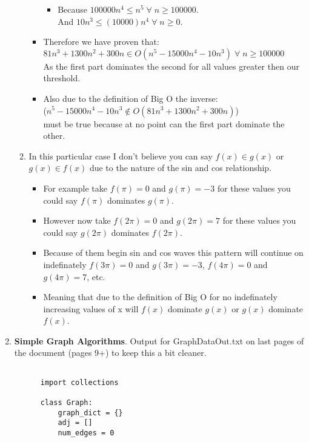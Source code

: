 \documentclass{article}
\begin{document}
\begin{enumerate}
\begin{enumerate}
\begin{itemize}
\begin{itemize}
            \item Because $100000n^4 \leq n^5 \;\forall\; n \geq 100000$. \\
                  And $10n^3 \leq (10000)n^4 \;\forall\; n \geq 0$.
          \end{itemize}
          \item Therefore we have proven that: \\
          $81n^3 + 1300n^2 + 300n \in O(n^5 - 15000n^4 - 10n^3)\;\forall\;n \geq 100000$ \\
          As the first part dominates the second for all values greater then our threshold.
          \item Also due to the definition of Big O the inverse:\\ ($n^5 - 15000n^4 - 10n^3 \notin O(81n^3 + 1300n^2 + 300n)$) \\ must be true because at no point can the first part dominate the other. 
      \end{itemize}
      \item In this particular case I don't believe you can say $f(x) \in g(x)$ or $g(x) \in f(x)$ due to the nature of the sin and cos relationship.
      \begin{itemize}
        \item For example take $f(\pi) = 0$ and $g(\pi) = -3$ for these values you could say $f(\pi)$ dominates $g(\pi)$.
        \item However now take $f(2\pi) = 0$ and $g(2\pi) = 7$ for these values you could say $g(2\pi)$ dominates $f(2\pi)$.
        \item Because of them begin sin and cos waves this pattern will continue on indefinately $f(3\pi) = 0$ and $g(3\pi) = -3$, $f(4\pi) = 0$ and $g(4\pi) = 7$, etc.
        \item Meaning that due to the definition of Big O for no indefinately increasing values of x will $f(x)$ dominate $g(x)$ or $g(x)$ dominate $f(x)$.
      \end{itemize}
    \end{enumerate}

    \item \textbf{Simple Graph Algorithms}. Output for GraphDataOut.txt on last pages of the document (pages 9+) to keep this a bit cleaner.
    \begin{lstlisting}
        
      import collections
      
      class Graph:    
          graph_dict = {}
          adj = []
          num_edges = 0
      

\end{lstlisting}
\end{enumerate}
\end{document}
